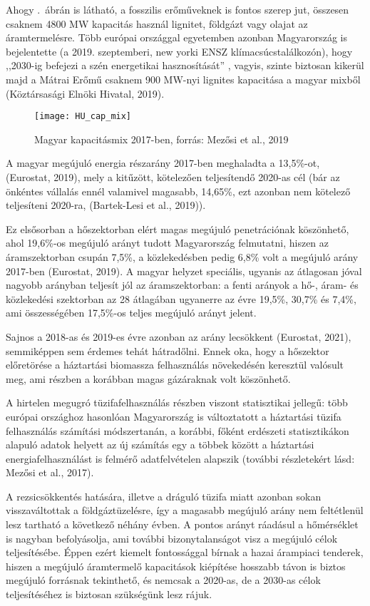 \documentclass[twoside, magyar, showtrims]{corvinusphd}
\begin{document}
Ahogy .~ábrán is látható, 
a fosszilis erőműveknek is fontos szerep jut, 
összesen csaknem 4800 MW kapacitás használ
lignitet, földgázt vagy olajat az áramtermelésre.
Több európai országgal egyetemben azonban
Magyarország is bejelentette (a 2019. szeptemberi, new yorki
ENSZ klímacsúcstalálkozón), hogy ,,2030-ig befejezi
a szén energetikai hasznosítását'' , vagyis, szinte biztosan
kikerül majd a Mátrai Erőmű csaknem 900 MW-nyi lignites kapacitása
a magyar mixből (Köztársasági Elnöki Hivatal, 2019).

\begin{figure}
    \centering
    \texttt{[image: HU\_cap\_mix]}
    \caption{Magyar kapacitásmix 2017-ben, forrás: Mezősi et al., 2019}
    \label{fig:HU_cap_mix}
\end{figure}

A magyar megújuló energia részarány 2017-ben meghaladta a 13,5\%-ot,
(Eurostat, 2019), mely a kitűzött, kötelezően teljesítendő 2020-as cél
(bár az önkéntes vállalás ennél valamivel magasabb, 14,65\%, ezt
azonban nem kötelező teljesíteni 2020-ra, (Bartek-Lesi et al., 2019)).

Ez elsősorban a hőszektorban 
elért magas megújuló penetrációnak köszönhető, ahol 19,6\%-os
megújuló arányt tudott Magyarország felmutatni, hiszen az
áramszektorban csupán 7,5\%, a közlekedésben pedig 6,8\% volt
a megújuló arány 2017-ben (Eurostat, 2019). 
A magyar helyzet speciális, ugyanis az  átlagosan jóval nagyobb arányban
teljesít jól az áramszektorban: a fenti arányok a hő-, áram- 
és közlekedési szektorban az 28 átlagában 
ugyanerre az évre 19,5\%,
30,7\% és 7,4\%, ami összességében 17,5\%-os teljes
megújuló arányt jelent.

Sajnos a 2018-as és 2019-es évre azonban az arány lecsökkent
(Eurostat, 2021), semmiképpen sem érdemes tehát hátradőlni.
Ennek oka, hogy a hőszektor előretörése a háztartási biomassza
felhasználás növekedésén keresztül valósult meg,
ami részben a korábban magas gázáraknak volt köszönhető.

A hirtelen megugró tüzifafelhasználás részben viszont
statisztikai jellegű: több európai országhoz hasonlóan
Magyarország is változtatott a háztartási tüzifa felhasználás
számítási módszertanán, a korábbi, főként erdészeti statisztikákon
alapuló adatok helyett az új számítás egy a többek között a háztartási
energiafelhasználást is felmérő adatfelvételen alapszik 
(további részletekért lásd: Mezősi et al., 2017).

A rezsicsökkentés hatására, illetve a dráguló tüzifa miatt
azonban sokan visszaváltottak a földgáztüzelésre, így a magasabb 
megújuló arány nem feltétlenül lesz tartható a következő néhány évben.
A pontos arányt ráadásul a hőmérséklet is nagyban befolyásolja, 
ami további bizonytalanságot visz a megújuló célok teljesítésébe.
Éppen ezért kiemelt fontossággal bírnak a hazai
árampiaci tenderek, hiszen a megújuló áramtermelő
kapacitások kiépítése hosszabb távon is biztos megújuló forrásnak
tekinthető, és nemcsak a 2020-as, de a 2030-as célok
teljesítéséhez is biztosan szükségünk lesz rájuk.
\end{document}
